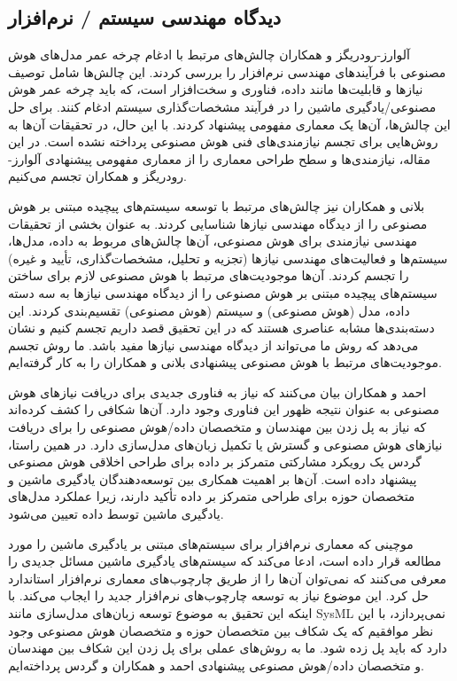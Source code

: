 \documentclass[a4paper,10pt]{article}
\begin{document}
        \subsection{دیدگاه مهندسی سیستم / نرم‌افزار}

            آلوارز-رودریگز و همکاران چالش‌های مرتبط با ادغام چرخه عمر مدل‌های هوش مصنوعی با فرآیندهای مهندسی نرم‌افزار را بررسی کردند. این چالش‌ها شامل توصیف نیازها و قابلیت‌ها مانند داده، فناوری و سخت‌افزار است، که باید چرخه عمر هوش مصنوعی/یادگیری ماشین را در فرآیند مشخصات‌گذاری سیستم ادغام کنند. برای حل این چالش‌ها، آن‌ها یک معماری مفهومی پیشنهاد کردند. با این حال، در تحقیقات آن‌ها به روش‌هایی برای تجسم نیازمندی‌های فنی هوش مصنوعی پرداخته نشده است. در این مقاله، نیازمندی‌ها و سطح طراحی معماری را از معماری مفهومی پیشنهادی آلوارز-رودریگز و همکاران تجسم می‌کنیم.

            بلانی و همکاران نیز چالش‌های مرتبط با توسعه سیستم‌های پیچیده مبتنی بر هوش مصنوعی را از دیدگاه مهندسی نیازها شناسایی کردند. به عنوان بخشی از تحقیقات مهندسی نیازمندی برای هوش مصنوعی، آن‌ها چالش‌های مربوط به داده، مدل‌ها، سیستم‌ها و فعالیت‌های مهندسی نیازها (تجزیه و تحلیل، مشخصات‌گذاری، تأیید و غیره) را تجسم کردند. آن‌ها موجودیت‌های مرتبط با هوش مصنوعی لازم برای ساختن سیستم‌های پیچیده مبتنی بر هوش مصنوعی را از دیدگاه مهندسی نیازها به سه دسته داده، مدل (هوش مصنوعی) و سیستم (هوش مصنوعی) تقسیم‌بندی کردند. این دسته‌بندی‌ها مشابه عناصری هستند که در این تحقیق قصد داریم تجسم کنیم و نشان می‌دهد که روش ما می‌تواند از دیدگاه مهندسی نیازها مفید باشد. ما روش تجسم موجودیت‌های مرتبط با هوش مصنوعی پیشنهادی بلانی و همکاران را به کار گرفته‌ایم.

            احمد و همکاران بیان می‌کنند که نیاز به فناوری جدیدی برای دریافت نیازهای هوش مصنوعی به عنوان نتیجه ظهور این فناوری وجود دارد. آن‌ها شکافی را کشف کرده‌اند که نیاز به پل زدن بین مهندسان و متخصصان داده/هوش مصنوعی را برای دریافت نیازهای هوش مصنوعی و گسترش یا تکمیل زبان‌های مدل‌سازی دارد. در همین راستا، گردس یک رویکرد مشارکتی متمرکز بر داده برای طراحی اخلاقی هوش مصنوعی پیشنهاد داده است. آن‌ها بر اهمیت همکاری بین توسعه‌دهندگان یادگیری ماشین و متخصصان حوزه برای طراحی متمرکز بر داده تأکید دارند، زیرا عملکرد مدل‌های یادگیری ماشین توسط داده تعیین می‌شود.

            موچینی که معماری نرم‌افزار برای سیستم‌های مبتنی بر یادگیری ماشین را مورد مطالعه قرار داده است، ادعا می‌کند که سیستم‌های یادگیری ماشین مسائل جدیدی را معرفی می‌کنند که نمی‌توان آن‌ها را از طریق چارچوب‌های معماری نرم‌افزار استاندارد حل کرد. این موضوع نیاز به توسعه چارچوب‌های نرم‌افزار جدید را ایجاب می‌کند. با اینکه این تحقیق به موضوع توسعه زبان‌های مدل‌سازی مانند SysML نمی‌پردازد، با این نظر موافقیم که یک شکاف بین متخصصان حوزه و متخصصان هوش مصنوعی وجود دارد که باید پل زده شود. ما به روش‌های عملی برای پل زدن این شکاف بین مهندسان و متخصصان داده/هوش مصنوعی پیشنهادی احمد و همکاران و گردس پرداخته‌ایم.
\end{document}
